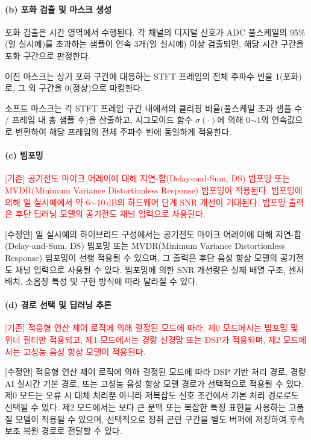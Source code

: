 \documentclass{article}
\newcommand{\reviewold}[1]{{\par\noindent\textcolor{red}{[기존] #1}}}
\newcommand{\reviewnew}[1]{{\par\noindent\textcolor{customblue}{[수정안] #1}}}
\newcommand{\reviewpair}[2]{\reviewold{#1}\reviewnew{#2}\par}
\begin{document}
\paragraph{(b) 포화 검출 및 마스크 생성}

포화 검출은 시간 영역에서 수행된다. 각 채널의 디지털 신호가 ADC 풀스케일의 95\%(일 실시예)를 초과하는 샘플이 연속 3개(일 실시예) 이상 검출되면, 해당 시간 구간을 포화 구간으로 판정한다.

이진 마스크는 상기 포화 구간에 대응하는 STFT 프레임의 전체 주파수 빈을 1(포화)로, 그 외 구간을 0(정상)으로 마킹한다.

소프트 마스크는 각 STFT 프레임 구간 내에서의 클리핑 비율(풀스케일 초과 샘플 수 / 프레임 내 총 샘플 수)을 산출하고, 시그모이드 함수 $\sigma(\cdot)$에 의해 0$\sim$1의 연속값으로 변환하여 해당 프레임의 전체 주파수 빈에 동일하게 적용한다.

\paragraph{(c) 빔포밍}

\reviewpair{공기전도 마이크 어레이에 대해 지연-합(Delay-and-Sum, DS) 빔포밍 또는 MVDR(Minimum Variance Distortionless Response) 빔포밍이 적용된다. 빔포밍에 의해 일 실시예에서 약 6$\sim$10\,dB의 하드웨어 단계 SNR 개선이 기대된다. 빔포밍 출력은 후단 딥러닝 모델의 공기전도 채널 입력으로 사용된다.}{일 실시예의 하이브리드 구성에서는 공기전도 마이크 어레이에 대해 지연-합(Delay-and-Sum, DS) 빔포밍 또는 MVDR(Minimum Variance Distortionless Response) 빔포밍이 선행 적용될 수 있으며, 그 출력은 후단 음성 향상 모델의 공기전도 채널 입력으로 사용될 수 있다. 빔포밍에 의한 SNR 개선량은 실제 배열 구조, 센서 배치, 소음장 특성 및 구현 방식에 따라 달라질 수 있다.}

\paragraph{(d) 경로 선택 및 딥러닝 추론}

\reviewpair{적응형 연산 제어 로직에 의해 결정된 모드에 따라, 제0 모드에서는 빔포밍 및 위너 필터만 적용되고, 제1 모드에서는 경량 신경망 또는 DSP가 적용되며, 제2 모드에서는 고성능 음성 향상 모델이 적용된다.}{적응형 연산 제어 로직에 의해 결정된 모드에 따라 DSP 기반 처리 경로, 경량 AI 실시간 기본 경로, 또는 고성능 음성 향상 모델 경로가 선택적으로 적용될 수 있다. 제0 모드는 오류 시 대체 처리뿐 아니라 저복잡도 신호 조건에서 기본 처리 경로로도 선택될 수 있다. 제2 모드에서는 보다 큰 문맥 또는 복잡한 특징 표현을 사용하는 고품질 모델이 적용될 수 있으며, 선택적으로 청취 곤란 구간을 별도 버퍼에 저장하여 후속 보조 복원 경로로 전달할 수 있다.}
\end{document}
